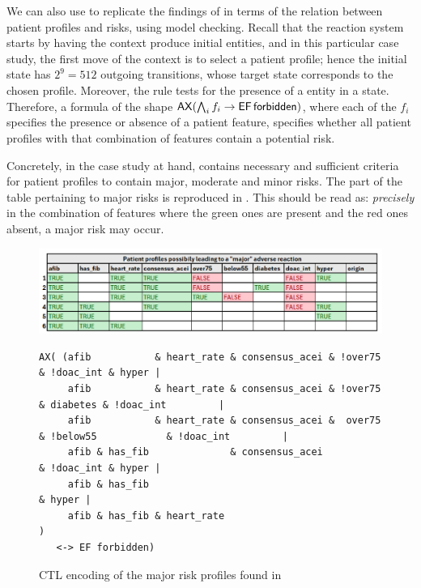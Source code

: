 \medskip\noindent We can also use \GROOVE to replicate the findings of \cite[Fig.~6]{DBLP:conf/cmsb/BowlesBBFGM24} in terms of the relation between patient profiles and risks, using model checking. Recall that the reaction system starts by having the context produce initial entities, and in this particular case study, the first move of the context is to select a patient profile; hence the initial state has $2^9=512$ outgoing transitions, whose target state corresponds to the chosen profile. Moreover, the rule \forbidden tests for the presence of a \Forbidden entity in a state. Therefore, a formula of the shape
$\mathop{\mathsf{AX}}(\bigwedge_i f_i \rightarrow \mathop{\mathsf{EF}} {\text{\sffamily forbidden}})$, where each of the $f_i$ specifies the presence or absence of a patient feature, specifies whether all patient profiles with that combination of features contain a potential risk.

Concretely, in the case study at hand, \cite[Fig.~6]{DBLP:conf/cmsb/BowlesBBFGM24} contains necessary and sufficient criteria for patient profiles to contain major, moderate and minor risks. The part of the table pertaining to major risks is reproduced in . This should be read as: \emph{precisely} in the combination of features where the green ones are present and the red ones absent, a major risk may occur.
%
\begin{figure}
\centering
\includegraphics[scale=.4]{./figs/table-from-cmsb2024}\begin{lstlisting}[basicstyle=\ttfamily\small,xleftmargin=0cm]
AX( (afib           & heart_rate & consensus_acei & !over75                       & !doac_int & hyper |
     afib           & heart_rate & consensus_acei & !over75            & diabetes & !doac_int         |
     afib           & heart_rate & consensus_acei &  over75 & !below55            & !doac_int         |
     afib & has_fib              & consensus_acei                                 & !doac_int & hyper |
     afib & has_fib                                                                           & hyper |
     afib & has_fib & heart_rate                                                                      )
   <-> EF forbidden)
\end{lstlisting}
\caption{CTL encoding of the major risk profiles found in \cite[Fig.~6]{DBLP:conf/cmsb/BowlesBBFGM24}}
\label{fig:table-from-cmsb2024}
\end{figure}

